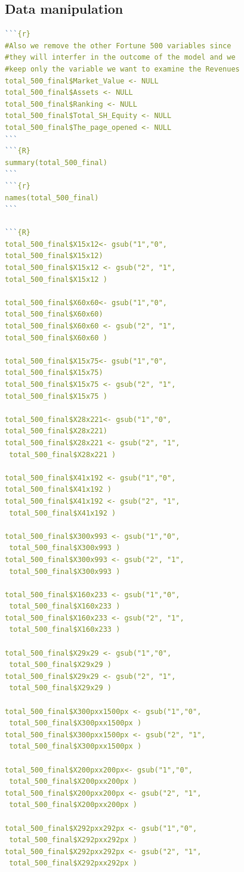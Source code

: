 \documentclass{book}
\begin{document}
\subsection{Data manipulation}\label{r: van: dm}
\begin{lstlisting}[language=R]
```{r}
#Also we remove the other Fortune 500 variables since 
#they will interfer in the outcome of the model and we 
#keep only the variable we want to examine the Revenues
total_500_final$Market_Value <- NULL
total_500_final$Assets <- NULL
total_500_final$Ranking <- NULL 
total_500_final$Total_SH_Equity <- NULL
total_500_final$The_page_opened <- NULL
```
```{R}
summary(total_500_final)
```
```{r}
names(total_500_final)
```

```{R}
total_500_final$X15x12<- gsub("1","0", 
total_500_final$X15x12)
total_500_final$X15x12 <- gsub("2", "1", 
total_500_final$X15x12 )

total_500_final$X60x60<- gsub("1","0", 
total_500_final$X60x60)
total_500_final$X60x60 <- gsub("2", "1", 
total_500_final$X60x60 )

total_500_final$X15x75<- gsub("1","0", 
total_500_final$X15x75)
total_500_final$X15x75 <- gsub("2", "1", 
total_500_final$X15x75 )

total_500_final$X28x221<- gsub("1","0", 
total_500_final$X28x221)
total_500_final$X28x221 <- gsub("2", "1",
 total_500_final$X28x221 )

total_500_final$X41x192 <- gsub("1","0", 
total_500_final$X41x192 )
total_500_final$X41x192 <- gsub("2", "1",
 total_500_final$X41x192 )

total_500_final$X300x993 <- gsub("1","0",
 total_500_final$X300x993 )
total_500_final$X300x993 <- gsub("2", "1",
 total_500_final$X300x993 )

total_500_final$X160x233 <- gsub("1","0",
 total_500_final$X160x233 )
total_500_final$X160x233 <- gsub("2", "1",
 total_500_final$X160x233 )

total_500_final$X29x29 <- gsub("1","0",
 total_500_final$X29x29 )
total_500_final$X29x29 <- gsub("2", "1",
 total_500_final$X29x29 )

total_500_final$X300pxx1500px <- gsub("1","0",
 total_500_final$X300pxx1500px )
total_500_final$X300pxx1500px <- gsub("2", "1",
 total_500_final$X300pxx1500px )

total_500_final$X200pxx200px<- gsub("1","0",
 total_500_final$X200pxx200px )
total_500_final$X200pxx200px <- gsub("2", "1",
 total_500_final$X200pxx200px )

total_500_final$X292pxx292px <- gsub("1","0",
 total_500_final$X292pxx292px )
total_500_final$X292pxx292px <- gsub("2", "1",
 total_500_final$X292pxx292px )


\end{lstlisting}
\end{document}
